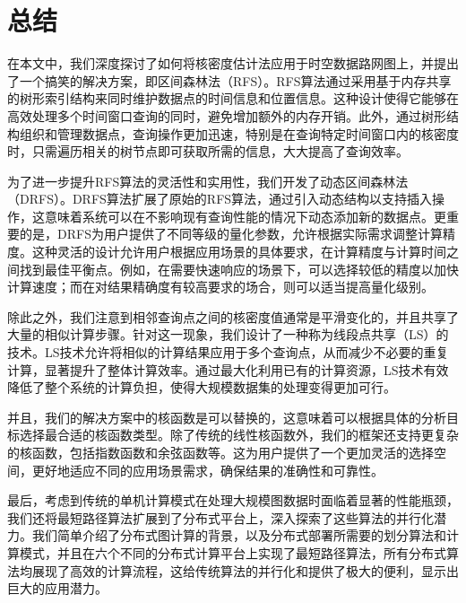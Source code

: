 \chapter{总结}

	在本文中，我们深度探讨了如何将核密度估计法应用于时空数据路网图上，并提出了一个搞笑的解决方案，即区间森林法（RFS）。RFS算法通过采用基于内存共享的树形索引结构来同时维护数据点的时间信息和位置信息。这种设计使得它能够在高效处理多个时间窗口查询的同时，避免增加额外的内存开销。此外，通过树形结构组织和管理数据点，查询操作更加迅速，特别是在查询特定时间窗口内的核密度时，只需遍历相关的树节点即可获取所需的信息，大大提高了查询效率。

	为了进一步提升RFS算法的灵活性和实用性，我们开发了动态区间森林法（DRFS）。DRFS算法扩展了原始的RFS算法，通过引入动态结构以支持插入操作，这意味着系统可以在不影响现有查询性能的情况下动态添加新的数据点。更重要的是，DRFS为用户提供了不同等级的量化参数，允许根据实际需求调整计算精度。这种灵活的设计允许用户根据应用场景的具体要求，在计算精度与计算时间之间找到最佳平衡点。例如，在需要快速响应的场景下，可以选择较低的精度以加快计算速度；而在对结果精确度有较高要求的场合，则可以适当提高量化级别。

	除此之外，我们注意到相邻查询点之间的核密度值通常是平滑变化的，并且共享了大量的相似计算步骤。针对这一现象，我们设计了一种称为线段点共享（LS）的技术。LS技术允许将相似的计算结果应用于多个查询点，从而减少不必要的重复计算，显著提升了整体计算效率。通过最大化利用已有的计算资源，LS技术有效降低了整个系统的计算负担，使得大规模数据集的处理变得更加可行。

	并且，我们的解决方案中的核函数是可以替换的，这意味着可以根据具体的分析目标选择最合适的核函数类型。除了传统的线性核函数外，我们的框架还支持更复杂的核函数，包括指数函数和余弦函数等。这为用户提供了一个更加灵活的选择空间，更好地适应不同的应用场景需求，确保结果的准确性和可靠性。

	最后，考虑到传统的单机计算模式在处理大规模图数据时面临着显著的性能瓶颈，我们还将最短路径算法扩展到了分布式平台上，深入探索了这些算法的并行化潜力。我们简单介绍了分布式图计算的背景，以及分布式部署所需要的划分算法和计算模式，并且在六个不同的分布式计算平台上实现了最短路径算法，所有分布式算法均展现了高效的计算流程，这给传统算法的并行化和提供了极大的便利，显示出巨大的应用潜力。

	
